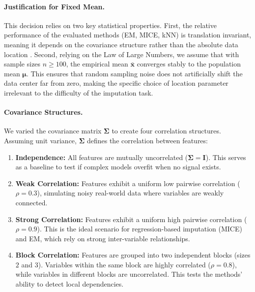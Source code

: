 \documentclass[11pt, a4paper]{article}
\begin{document}
\paragraph{Justification for Fixed Mean.}
This decision relies on two key statistical properties.
First, the relative performance of the evaluated methods (EM, MICE, kNN) is translation invariant, meaning it depends on the covariance structure rather than the absolute data location \citep{LittleRubin2019}.
Second, relying on the Law of Large Numbers, we assume that with sample sizes $n \geq 100$, the empirical mean $\bar{\mathbf{x}}$ converges stably to the population mean $\boldsymbol{\mu}$.
This ensures that random sampling noise does not artificially shift the data center far from zero, making the specific choice of location parameter irrelevant to the difficulty of the imputation task.

\paragraph{Covariance Structures.} We varied the covariance matrix $\boldsymbol{\Sigma}$ to create four correlation structures. Assuming unit variance, $\boldsymbol{\Sigma}$ defines the correlation between features:

\begin{enumerate}
    \item \textbf{Independence:} All features are mutually uncorrelated ($\boldsymbol{\Sigma} = \mathbf{I}$).
    This serves as a baseline to test if complex models overfit when no signal exists.

    \item \textbf{Weak Correlation:} Features exhibit a uniform low pairwise correlation ($\rho = 0.3$), simulating noisy real-world data where variables are weakly connected.

    \item \textbf{Strong Correlation:} Features exhibit a uniform high pairwise correlation ($\rho = 0.9$).
    This is the ideal scenario for regression-based imputation (MICE) and EM, which rely on strong inter-variable relationships.

    \item \textbf{Block Correlation:} Features are grouped into two independent blocks (sizes $2$ and $3$). Variables within the same block are highly correlated ($\rho = 0.8$), while variables in different blocks are uncorrelated.
    This tests the methods' ability to detect local dependencies.
\end{enumerate}
\end{document}
